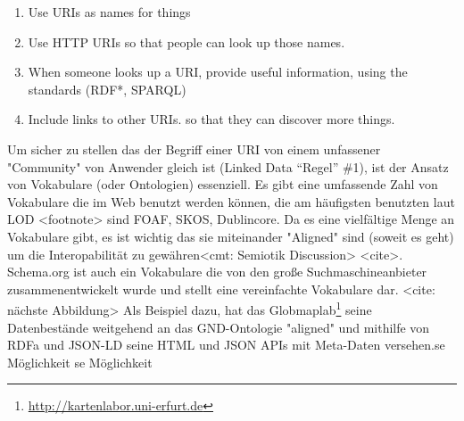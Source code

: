 \begin{enumerate}
	\item Use URIs as names for things
	\item Use HTTP URIs so that people can look up those names.
	\item When someone looks up a URI, provide useful information, using the standards (RDF*, SPARQL)
	\item Include links to other URIs. so that they can discover more things.
\end{enumerate}

Um sicher zu stellen das der Begriff einer URI von einem unfassener "Community" von Anwender gleich ist (Linked Data \hyphenquote{german}{Regel} \#1), ist der Ansatz von Vokabulare (oder Ontologien) essenziell. Es gibt eine umfassende Zahl von Vokabulare die im Web benutzt werden können, die am häufigsten benutzten laut LOD <footnote> sind FOAF, SKOS, Dublincore. Da es eine vielfältige Menge an Vokabulare gibt, es ist wichtig das sie miteinander "Aligned" sind (soweit es geht) um die Interopabilität zu gewähren<cmt: Semiotik Discussion> <cite>. Schema.org ist auch ein Vokabulare die von den große Suchmaschineanbieter zusammenentwickelt wurde und stellt eine vereinfachte Vokabulare dar. <cite: nächste Abbildung> Als Beispiel dazu, hat das Globmaplab\footnote{\url{http://kartenlabor.uni-erfurt.de}} seine Datenbestände weitgehend an das GND-Ontologie "aligned" und mithilfe von RDFa und JSON-LD seine HTML und JSON APIs mit Meta-Daten versehen.se Möglichkeit 
se Möglichkeit 




